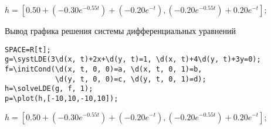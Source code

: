 {$h = [0. 50+(-0. 30 e^{-0. 55t})+(-0. 20 e^{-t}), (-0. 20 e^{-0. 55t})+0. 20 e^{-t}];$}

Вывод графика решения системы дифференциальных уравнений

\begin{verbatim}
SPACE=R[t];
g=\systLDE(3\d(x, t)+2x+\d(y, t)=1, \d(x, t)+4\d(y, t)+3y=0);
f=\initCond(\d(x, t, 0, 0)=a, \d(x, t, 0, 1)=b, 
            \d(y, t, 0, 0)=c, \d(y, t, 0, 1)=d);
h=\solveLDE(g, f, 1); 
p=\plot(h,[-10,10,-10,10]); 
\end{verbatim}

{$h = [0. 50+(-0. 30 e^{-0. 55t})+(-0. 20 e^{-t}), (-0. 20 e^{-0. 55t})+0. 20 e^{-t}];$}

